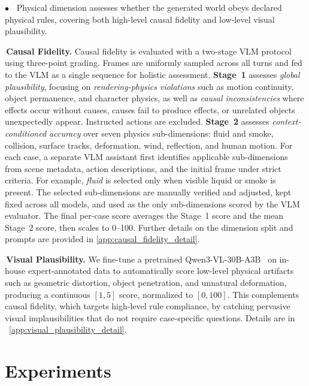 \documentclass{llmxive}
\providecommand{\tagbox}[2]{\smash{\setlength{\fboxsep}{2.3pt}\raisebox{0.5pt}{\colorbox{#1}{#2}}}\vphantom{#2}}
\providecommand{\myparagraph}[1]{\vspace{-0.1em}\noindent\textbf{#1}\hspace{0.3em}}
\begin{document}
\vspace{1mm}
\myparagraph{$\bullet$~\tagbox{dimPH}{Physical.}}
Physical dimension assesses whether the generated world obeys declared physical rules, covering both high-level causal fidelity and low-level visual plausibility.

\myparagraph{\tagbox{dimPH}{P.1}\,Causal Fidelity.}
Causal fidelity is evaluated with a two-stage VLM protocol using three-point grading. Frames are uniformly sampled across all turns and fed to the VLM as a single sequence for holistic assessment.
\textbf{Stage~1} assesses \emph{global plausibility}, focusing on \emph{rendering-physics violations} such as motion continuity, object permanence, and character physics, as well as \emph{causal inconsistencies} where effects occur without causes, causes fail to produce effects, or unrelated objects unexpectedly appear. Instructed actions are excluded.
\textbf{Stage~2} assesses \emph{context-conditioned accuracy} over seven physics sub-dimensions: fluid and smoke, collision, surface tracks, deformation, wind, reflection, and human motion. For each case, a separate VLM assistant first identifies applicable sub-dimensions from scene metadata, action descriptions, and the initial frame under strict criteria. For example, \emph{fluid} is selected only when visible liquid or smoke is present. The selected sub-dimensions are manually verified and adjusted, kept fixed across all models, and used as the only sub-dimensions scored by the VLM evaluator.
The final per-case score averages the Stage~1 score and the mean Stage~2 score, then scales to 0--100. Further details on the dimension split and prompts are provided in \ref{app:causal_fidelity_detail}.


\myparagraph{\tagbox{dimPH}{P.2}\,Visual Plausibility.}
We fine-tune a pretrained Qwen3-VL-30B-A3B~\cite{Qwen3-VL} on in-house expert-annotated data to automatically score low-level physical artifacts such as geometric distortion, object penetration, and unnatural deformation, producing a continuous $[1, 5]$ score, normalized to $[0, 100]$.
This complements causal fidelity, which targets high-level rule compliance, by catching pervasive visual implausibilities that do not require case-specific questions. Details are in ~\cref{app:visual_plausibility_detail}.

\section{Experiments}
\label{sec:experiments}
\end{document}
